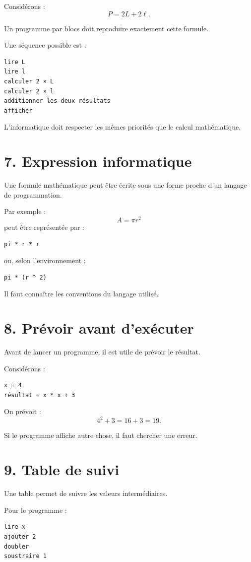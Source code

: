 Considérons :
\[
P=2L+2\ell.
\]

Un programme par blocs doit reproduire exactement cette formule.

Une séquence possible est :
\begin{verbatim}
lire L
lire l
calculer 2 × L
calculer 2 × l
additionner les deux résultats
afficher
\end{verbatim}

L'informatique doit respecter les mêmes priorités que le calcul mathématique.

\section{7. Expression informatique}

Une formule mathématique peut être écrite sous une forme proche d'un langage de programmation.

Par exemple :
\[
A=\pi r^2
\]
peut être représentée par :
\begin{verbatim}
pi * r * r
\end{verbatim}

ou, selon l'environnement :
\begin{verbatim}
pi * (r ^ 2)
\end{verbatim}

Il faut connaître les conventions du langage utilisé.

\section{8. Prévoir avant d'exécuter}

Avant de lancer un programme, il est utile de prévoir le résultat.

Considérons :
\begin{verbatim}
x = 4
résultat = x * x + 3
\end{verbatim}

On prévoit :
\[
4^2+3=16+3=19.
\]

Si le programme affiche autre chose, il faut chercher une erreur.

\section{9. Table de suivi}

Une table permet de suivre les valeurs intermédiaires.

Pour le programme :
\begin{verbatim}
lire x
ajouter 2
doubler
soustraire 1
\end{verbatim}

